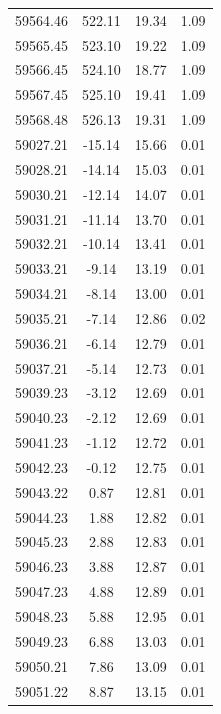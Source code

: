 \begin{longtable}{|c|c|c|c|}
 59564.46 &  522.11 &       19.34 &          1.09 \\
 59565.45 &  523.10 &       19.22 &          1.09 \\
 59566.45 &  524.10 &       18.77 &          1.09 \\
 59567.45 &  525.10 &       19.41 &          1.09 \\
 59568.48 &  526.13 &       19.31 &          1.09 \\
 59027.21 &  -15.14 &       15.66 &          0.01 \\
 59028.21 &  -14.14 &       15.03 &          0.01 \\
 59030.21 &  -12.14 &       14.07 &          0.01 \\
 59031.21 &  -11.14 &       13.70 &          0.01 \\
 59032.21 &  -10.14 &       13.41 &          0.01 \\
 59033.21 &   -9.14 &       13.19 &          0.01 \\
 59034.21 &   -8.14 &       13.00 &          0.01 \\
 59035.21 &   -7.14 &       12.86 &          0.02 \\
 59036.21 &   -6.14 &       12.79 &          0.01 \\
 59037.21 &   -5.14 &       12.73 &          0.01 \\
 59039.23 &   -3.12 &       12.69 &          0.01 \\
 59040.23 &   -2.12 &       12.69 &          0.01 \\
 59041.23 &   -1.12 &       12.72 &          0.01 \\
 59042.23 &   -0.12 &       12.75 &          0.01 \\
 59043.22 &    0.87 &       12.81 &          0.01 \\
 59044.23 &    1.88 &       12.82 &          0.01 \\
 59045.23 &    2.88 &       12.83 &          0.01 \\
 59046.23 &    3.88 &       12.87 &          0.01 \\
 59047.23 &    4.88 &       12.89 &          0.01 \\
 59048.23 &    5.88 &       12.95 &          0.01 \\
 59049.23 &    6.88 &       13.03 &          0.01 \\
 59050.21 &    7.86 &       13.09 &          0.01 \\
 59051.22 &    8.87 &       13.15 &          0.01 \\

\end{longtable}
